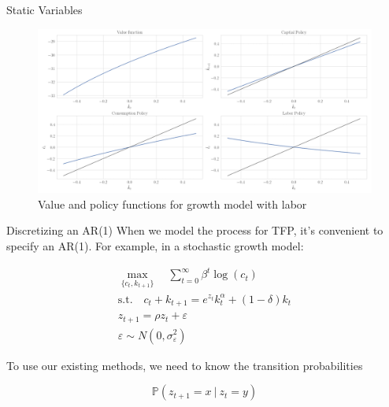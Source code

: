 \documentclass[11pt, xcolor={dvipsnames}, hyperref={colorlinks, allcolors=Blue}]{beamer}
\renewcommand{\P}{\mathbb{P}}
\renewcommand{\epsilon}{\varepsilon}
\begin{document}
\begin{frame}{Static Variables}

\begin{figure}
	\includegraphics[width=\textwidth]{Chart4.png}
	\caption{Value and policy functions for growth model with labor}
\end{figure}
\end{frame}

\begin{frame}{Discretizing an AR(1)}
When we model the process for TFP, it's convenient to specify an AR(1). For example, in a stochastic growth model:

\begin{gather*}
\underset{\{c_{t}, k_{t+1}\}}{\max} \quad \sum_{t=0}^{\infty} \beta^{t} \log(c_{t}) \\ 
\text{s.t.} \quad c_{t} + k_{t+1} = e^{z_{t}} k_{t}^{\alpha} + (1-\delta) k_{t}\\
z_{t+1} = \rho z_{t} + \epsilon\\
\epsilon \sim N(0, \sigma_{\epsilon}^{2})
\end{gather*}

To use our existing methods, we need to know the transition probabilities 

\[\P(z_{t+1} = x \ | \ z_{t} = y) \]

\end{frame}
\end{document}
